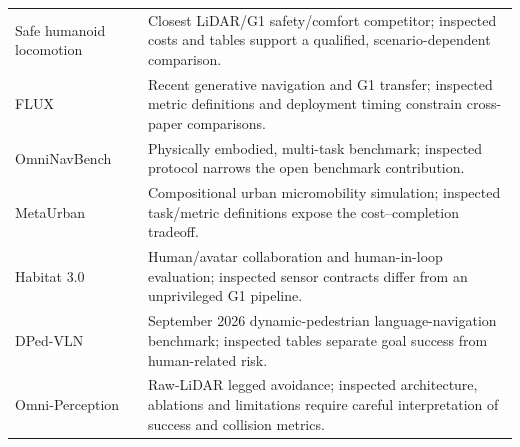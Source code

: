 \documentclass[11pt,a4paper]{article}
\begin{document}
\begin{longtable}{P{0.28\textwidth}P{0.65\textwidth}}
Safe humanoid locomotion \citep{safehumanoid} & Closest LiDAR/G1 safety/comfort competitor; inspected costs and tables support a qualified, scenario-dependent comparison. \\
FLUX \citep{flux} & Recent generative navigation and G1 transfer; inspected metric definitions and deployment timing constrain cross-paper comparisons. \\
OmniNavBench \citep{omninav} & Physically embodied, multi-task benchmark; inspected protocol narrows the open benchmark contribution. \\
MetaUrban \citep{metaurban} & Compositional urban micromobility simulation; inspected task/metric definitions expose the cost--completion tradeoff. \\
Habitat 3.0 \citep{habitat3} & Human/avatar collaboration and human-in-loop evaluation; inspected sensor contracts differ from an unprivileged G1 pipeline. \\
DPed-VLN \citep{dped} & September 2026 dynamic-pedestrian language-navigation benchmark; inspected tables separate goal success from human-related risk. \\
Omni-Perception \citep{omni} & Raw-LiDAR legged avoidance; inspected architecture, ablations and limitations require careful interpretation of success and collision metrics. \\
\end{longtable}
\normalsize


\end{document}
